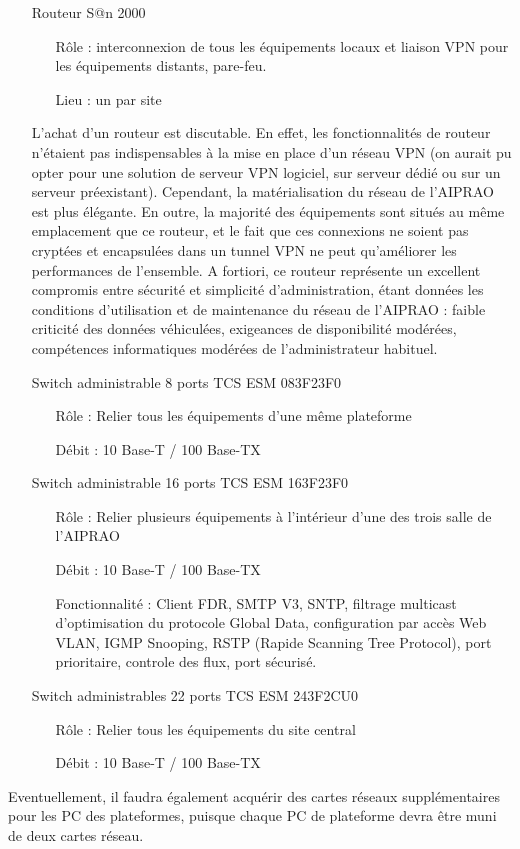 \el
\begin{itemize}
\item[Routeur S@n 2000]
\begin{itemize}
\item[Rôle]: interconnexion de tous les équipements locaux et liaison VPN pour
    les équipements distants, pare-feu.
\item[Lieu]: un par site
\end{itemize}


	L'achat d'un routeur est discutable. En effet, les fonctionnalités
de routeur n'étaient pas indispensables à la mise en place d'un réseau
VPN (on aurait pu opter pour une solution de serveur VPN logiciel, sur
serveur dédié ou sur un serveur préexistant).
	Cependant, la matérialisation du réseau de l'AIPRAO est plus élégante.
En outre, la majorité des équipements sont situés au même emplacement que
ce routeur, et le fait que ces connexions ne soient pas cryptées et encapsulées
dans un tunnel VPN ne peut qu'améliorer les performances de l'ensemble.
	A fortiori, ce routeur représente un excellent compromis entre sécurité et
simplicité d'administration, étant données les conditions d'utilisation et de
maintenance du réseau de l'AIPRAO : faible criticité des données véhiculées,
exigeances de disponibilité modérées, compétences informatiques modérées de
l'administrateur habituel.

\el
\item[Switch administrable 8 ports TCS ESM 083F23F0]
\begin{itemize}
\item[Rôle] : Relier tous les équipements d'une même plateforme
\item[Débit] : 10 Base-T / 100 Base-TX
\end{itemize}
\el

\item[Switch administrable 16 ports TCS ESM 163F23F0]
\begin{itemize}
\item[Rôle] : Relier plusieurs équipements à l'intérieur d'une des
    trois salle de l'AIPRAO
\item[Débit] : 10 Base-T / 100 Base-TX
\item[Fonctionnalité]: Client FDR, SMTP V3, SNTP, filtrage multicast d’optimisation du
protocole Global Data, configuration par accès Web VLAN, IGMP Snooping,
RSTP (Rapide Scanning Tree Protocol), port prioritaire, controle des flux,
port sécurisé.
\end{itemize}
\el
\item[Switch administrables 22 ports TCS ESM 243F2CU0]
\begin{itemize}
\item[Rôle] : Relier tous les équipements du site central
\item[Débit] : 10 Base-T / 100 Base-TX
\end{itemize}

\end{itemize}
Eventuellement, il faudra également acquérir des cartes réseaux supplémentaires
pour les PC des plateformes, puisque chaque PC de plateforme devra être muni de
deux cartes réseau.



